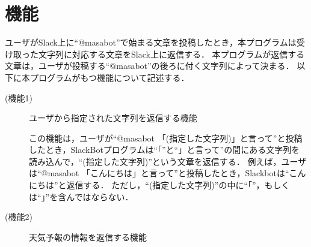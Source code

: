 \documentclass[12pt]{jsarticle}
\begin{document}
\section{機能}\label{sec:function}
ユーザがSlack上に``@masabot''で始まる文章を投稿したとき，本プログラムは受け取った文字列に対応する文章をSlack上に返信する．
本プログラムが返信する文章は，ユーザが投稿する``@masabot''の後ろに付く文字列によって決まる．
以下に本プログラムがもつ機能について記述する．
\begin{description}
\item[(機能1)] ユーザから指定された文字列を返信する機能
  
  この機能は，ユーザが``@masabot 「(指定した文字列)」と言って''と投稿したとき，SlackBotプログラムは``「''と``」と言って''の間にある文字列を読み込んで，``(指定した文字列)''という文章を返信する．
  例えば，ユーザは``@masabot 「こんにちは」と言って''と投稿したとき，Slackbotは``こんにちは''と返信する．
  ただし，``(指定した文字列)''の中に``「''，もしくは``」''を含んではならない．

\item[(機能2)]\label{func2}  %
  天気予報の情報を返信する機能


\end{description}
\end{document}
